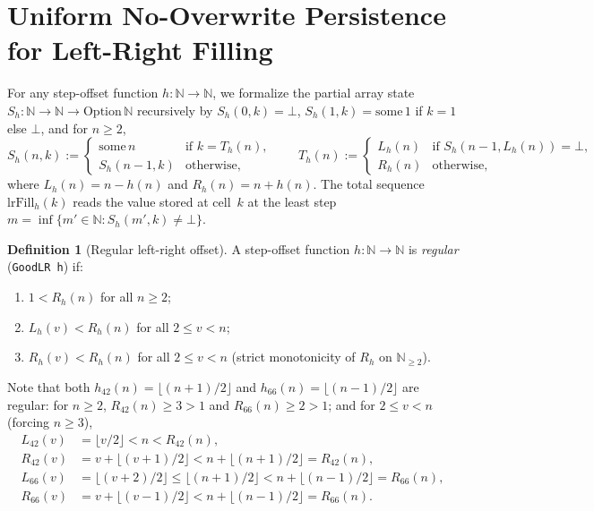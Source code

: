\documentclass[11pt]{article}
\theoremstyle{definition}
\newtheorem{definition}[theorem]{Definition}
\newcommand{\N}{\mathbb{N}}
\begin{document}
\section{Uniform No-Overwrite Persistence for Left-Right Filling}
\label{sec:lr}

For any step-offset function $h : \N \to \N$, we formalize the partial array state $S_h : \N \to \N \to \mathrm{Option}\,\N$ recursively by $S_h(0, k) = \bot$, $S_h(1, k) = \mathrm{some}\,1$ if $k = 1$ else $\bot$, and for $n \ge 2$,
\[
S_h(n, k) := \begin{cases}
\mathrm{some}\,n & \text{if } k = T_h(n), \\
S_h(n - 1, k) & \text{otherwise},
\end{cases}
\qquad
T_h(n) := \begin{cases}
L_h(n) & \text{if } S_h(n - 1, L_h(n)) = \bot, \\
R_h(n) & \text{otherwise},
\end{cases}
\]
where $L_h(n) = n - h(n)$ and $R_h(n) = n + h(n)$. The total sequence $\mathrm{lrFill}_h(k)$ reads the value stored at cell~$k$ at the least step $m = \inf\{m' \in \N : S_h(m', k) \ne \bot\}$.

\begin{definition}[Regular left-right offset]
\label{def:good-lr}
A step-offset function $h : \N \to \N$ is \emph{regular} (\texttt{GoodLR h}) if:
\begin{enumerate}
\item[\textup{(i)}] $1 < R_h(n)$ for all $n \ge 2$;
\item[\textup{(ii)}] $L_h(v) < R_h(n)$ for all $2 \le v < n$;
\item[\textup{(iii)}] $R_h(v) < R_h(n)$ for all $2 \le v < n$ (strict monotonicity of $R_h$ on $\N_{\ge 2}$).
\end{enumerate}
\end{definition}

Note that both $h_{42}(n) = \lfloor (n+1)/2 \rfloor$ and $h_{66}(n) = \lfloor (n-1)/2 \rfloor$ are regular: for $n \ge 2$, $R_{42}(n) \ge 3 > 1$ and $R_{66}(n) \ge 2 > 1$; and for $2 \le v < n$ (forcing $n \ge 3$),
\begin{align*}
L_{42}(v) &= \lfloor v/2 \rfloor < n < R_{42}(n), \\
R_{42}(v) &= v + \lfloor (v+1)/2 \rfloor < n + \lfloor (n+1)/2 \rfloor = R_{42}(n), \\
L_{66}(v) &= \lfloor (v+2)/2 \rfloor \le \lfloor (n+1)/2 \rfloor < n + \lfloor (n-1)/2 \rfloor = R_{66}(n), \\
R_{66}(v) &= v + \lfloor (v-1)/2 \rfloor < n + \lfloor (n-1)/2 \rfloor = R_{66}(n).
\end{align*}
\end{document}
